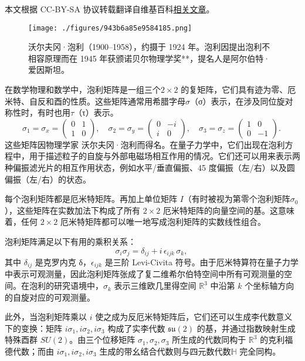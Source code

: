 
本文根据 CC-BY-SA 协议转载翻译自维基百科\href{https://en.wikipedia.org/wiki/Pauli_matrices}{相关文章}。

\begin{figure}[ht]
\centering
\texttt{[image: ./figures/943b6a85e9584185.png]}
\caption{沃尔夫冈·泡利（1900–1958），约摄于 1924 年。泡利因提出泡利不相容原理而在 1945 年获颁诺贝尔物理学奖**，提名人是阿尔伯特·爱因斯坦。} \label{fig_PLJZ_1}
\end{figure}
在数学物理和数学中，泡利矩阵是一组三个$2\times2$ 的复矩阵，它们具有迹为零、厄米特、自反和酉的性质。这些矩阵通常用希腊字母$\sigma$（σ）表示，在涉及同位旋对称性时，有时也用$\tau$（τ）表示。
$$
\sigma_1 = \sigma_x = 
\begin{pmatrix}
0 & 1 \\
1 & 0
\end{pmatrix},
\quad
\sigma_2 = \sigma_y = 
\begin{pmatrix}
0 & -i \\
i & 0
\end{pmatrix},
\quad
\sigma_3 = \sigma_z = 
\begin{pmatrix}
1 & 0 \\
0 & -1
\end{pmatrix}.~
$$
这些矩阵因物理学家 沃尔夫冈·泡利而得名。在量子力学中，它们出现在泡利方程中，用于描述粒子的自旋与外部电磁场相互作用的情况。它们还可以用来表示两种偏振滤光片的相互作用状态，例如水平/垂直偏振、45 度偏振（左/右）以及圆偏振（左/右）的状态。

每个泡利矩阵都是厄米特矩阵。再加上单位矩阵 $I$（有时被视为第零个泡利矩阵$\sigma_0$），这些矩阵在实数加法下构成了所有 $2 \times 2$ 厄米特矩阵的向量空间的基。这意味着，任何 $2 \times 2$ 厄米特矩阵都可以唯一地写成泡利矩阵的实数线性组合。

泡利矩阵满足以下有用的乘积关系：
$$
\sigma_i \sigma_j = \delta_{ij} + i \, \epsilon_{ijk} \, \sigma_k,~
$$
其中 $\delta_{ij}$ 是克罗内克 δ，$\epsilon_{ijk}$ 是三阶 Levi-Civita 符号。由于厄米特算符在量子力学中表示可观测量，因此泡利矩阵张成了复二维希尔伯特空间中所有可观测量的空间。在泡利的研究语境中，$\sigma_k$ 表示三维欧几里得空间 $\mathbb{R}^3$ 中沿第 $k$ 个坐标轴方向的自旋对应的可观测量。

此外，当泡利矩阵乘以 $i$ 使之成为反厄米特矩阵后，它们还可以生成李代数意义下的变换：矩阵 $i\sigma_1, i\sigma_2, i\sigma_3$ 构成了实李代数 $\mathfrak{su}(2)$ 的基，并通过指数映射生成特殊酉群 $SU(2)$。由三个位移矩阵 $\sigma_1, \sigma_2, \sigma_3$ 所生成的代数同构于 $\mathbb{R}^3$ 的克利福德代数；而由 $i\sigma_1, i\sigma_2, i\sigma_3$ 生成的带幺结合代数则与四元数代数$\mathbb{H}$ 完全同构。
